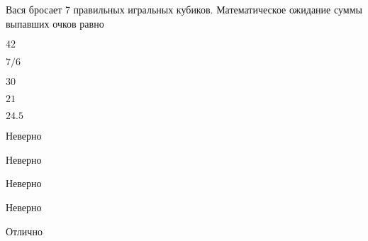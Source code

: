 
\begin{question}
Вася бросает 7 правильных игральных кубиков. Математическое ожидание
суммы выпавших очков равно
\begin{answerlist}
  \item \(42\)
  \item \(7/6\)
  \item \(30\)
  \item \(21\)
  \item \(24.5\)
\end{answerlist}
\end{question}

\begin{solution}
\begin{answerlist}
  \item Неверно
  \item Неверно
  \item Неверно
  \item Неверно
  \item Отлично
\end{answerlist}
\end{solution}

